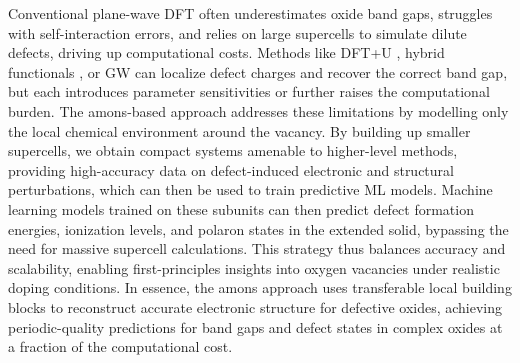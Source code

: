 \documentclass[11pt,english,calcwidth,compact]{nserc-appendix}
\begin{document}
Conventional plane-wave DFT often underestimates oxide band gaps, struggles with self-interaction errors, and relies on large supercells to simulate dilute defects, driving up computational costs. Methods like DFT+U \cite{wang2006oxidation,aykol2014local,macke2024orbital}, hybrid functionals \cite{gruneis2014ionization, chen2014band}, or GW \cite{chen2017accuracy} can localize defect charges and recover the correct band gap, but each introduces parameter sensitivities or further raises the computational burden. The amons-based approach addresses these limitations by modelling only the local chemical environment around the vacancy.  By building up smaller supercells, we obtain compact systems amenable to higher-level methods, providing high-accuracy data on defect-induced electronic and structural perturbations, which can then be used to train predictive ML models. Machine learning models trained on these subunits can then predict defect formation energies, ionization levels, and polaron states in the extended solid, bypassing the need for massive supercell calculations. This strategy thus balances accuracy and scalability, enabling first-principles insights into oxygen vacancies under realistic doping conditions. In essence, the amons approach uses transferable local building blocks to reconstruct accurate electronic structure for defective oxides, achieving periodic-quality predictions for band gaps and defect states in complex oxides at a fraction of the computational cost.


\end{document}
